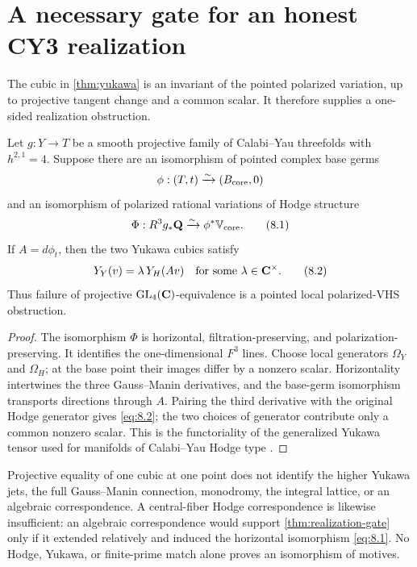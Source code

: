 \section{A necessary gate for an honest CY3 realization}
\label{sec:realization}

The cubic in \cref{thm:yukawa} is an invariant of the pointed polarized
variation, up to projective tangent change and a common scalar.  It
therefore supplies a one-sided realization obstruction.

\begin{theorem}
\label{thm:realization-gate}
Let \(g:Y\to T\) be a smooth projective family of Calabi--Yau threefolds
with \(h^{2,1}=4\).  Suppose there are an isomorphism of pointed complex
base germs
\[
 \phi:(T,t)\xrightarrow{\sim}(B_{\mathrm{core}},0)
\]
and an isomorphism of polarized rational variations of Hodge structure
\[
 \Phi:R^3g_*\mathbf Q\xrightarrow{\sim}\phi^*\mathbb V_{\mathrm{core}}.       \tag{8.1}
\label{eq:8.1}
\]
If \(A=d\phi_t\), then the two Yukawa cubics satisfy
\[
 Y_Y(v)=\lambda\,Y_H(Av)
 \quad\text{for some }\lambda\in\mathbf C^\times.         \tag{8.2}
\label{eq:8.2}
\]
Thus failure of projective \(\operatorname{GL}_4(\mathbf C)\)-equivalence is a
pointed local polarized-VHS obstruction.
\end{theorem}

\begin{proof}
The isomorphism \(\Phi\) is horizontal, filtration-preserving, and
polarization-preserving.  It identifies the one-dimensional \(F^3\) lines.
Choose local generators \(\Omega_Y\) and \(\Omega_H\); at the base point
their images differ by a nonzero scalar.  Horizontality intertwines the
three Gauss--Manin derivatives, and the base-germ isomorphism transports
directions through \(A\).  Pairing the third derivative with the original
Hodge generator gives \cref{eq:8.2}; the two choices of generator contribute
only a common nonzero scalar.  This is the functoriality of the generalized
Yukawa tensor used for manifolds of Calabi--Yau Hodge type
\cite[\S2]{IlievManivel2015}.
\end{proof}

\begin{remark}
Projective equality of one cubic at one point does not identify the higher
Yukawa jets, the full Gauss--Manin connection, monodromy, the integral
lattice, or an algebraic correspondence.  A central-fiber Hodge
correspondence is likewise insufficient: an algebraic correspondence would
support \cref{thm:realization-gate} only if it extended relatively and
induced the horizontal isomorphism \cref{eq:8.1}.  No Hodge, Yukawa, or
finite-prime match alone proves an isomorphism of motives.
\end{remark}

